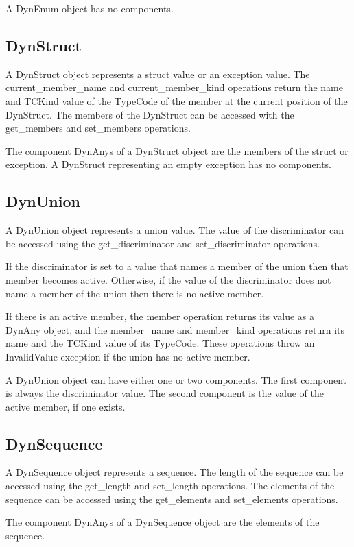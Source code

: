 A DynEnum object has no components.

\subsection{DynStruct}

A DynStruct object represents a struct value or an exception value.
The current\_member\_name and current\_member\_kind operations return
the name and TCKind value of the TypeCode of the member at the
current position of the DynStruct.  The members of the DynStruct can
be accessed with the get\_members and set\_members operations.

The component DynAnys of a DynStruct object are the members of the
struct or exception.  A DynStruct representing an empty exception has
no components.

\subsection{DynUnion}

A DynUnion object represents a union value.  The value of the
discriminator can be accessed using the get\_discriminator and
set\_discriminator operations.

If the discriminator is set to a value that names a member of the
union then that member becomes active.  Otherwise, if the value of
the discriminator does not name a member of the union then there is
no active member.

If there is an active member, the member operation returns its value
as a DynAny object, and the member\_name and member\_kind operations
return its name and the TCKind value of its TypeCode.  These
operations throw an InvalidValue exception if the union has no active
member.

A DynUnion object can have either one or two components.  The first
component is always the discriminator value.  The second component is
the value of the active member, if one exists.

\subsection{DynSequence}

A DynSequence object represents a sequence.  The length of the
sequence can be accessed using the get\_length and set\_length
operations.  The elements of the sequence can be accessed using the
get\_elements and set\_elements operations.

The component DynAnys of a DynSequence object are the elements of the
sequence.

